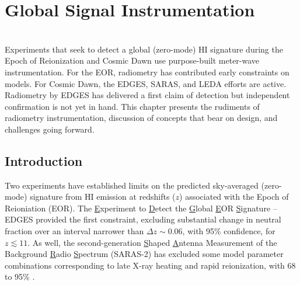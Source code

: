 

\chapter{Global Signal Instrumentation}

\begin{bf}
\author{  
L. J. Greenhill 
(Harvard-Smithsonian Center for Astrophysics) \\
R. Subrahmanyan 
(Raman Research Institute)   
}\\

\noindent
Experiments that seek to detect a global (zero-mode) HI signature during the Epoch of Reionization and Cosmic Dawn use purpose-built meter-wave instrumentation.  For the EOR, radiometry has contributed early constraints on models.   For Cosmic Dawn, the EDGES, SARAS, and LEDA efforts are active.  Radiometry by EDGES has delivered a first claim of detection but independent confirmation is not yet in hand. This chapter presents the rudiments of radiometry instrumentation, discussion of concepts that bear on design, and challenges going forward. \\

\end{bf}

\section{Introduction}

Two experiments have established limits on the predicted sky-averaged (zero-mode) signature from HI emission at redshifts ($z$) associated with the Epoch of Reioniation (EOR).  The {\underline E}xperiment to {\underline D}etect the {\underline G}lobal {\underline E}OR {\underline S}ignature -- EDGES \cite{bowman08,rogers12} provided the first constraint, excluding substantial change in neutral fraction over an interval narrower than $\Delta z\sim 0.06$, with 95\% confidence, for $z\lesssim 11$.  As well, the second-generation {\underline S}haped {\underline A}ntenna Measurement of the Background {\underline Ra}dio {\underline S}pectrum (SARAS-2) has excluded some model parameter combinations corresponding to late X-ray heating and rapid reionization, with 68 to 95\% \cite{patra13, singh17, singh18}.

